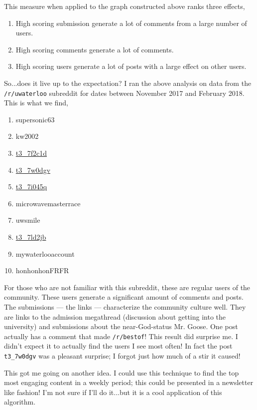 This measure when applied to the graph constructed above ranks three effects,
\begin{enumerate}
  \item{
    High scoring submission generate a lot of comments from a large number of users.
  }
  \item{
    High scoring comments generate a lot of comments.
  }
  \item{
    High scoring users generate a lot of posts with a large effect on other users.
  }
\end{enumerate}
So...does it live up to the expectation?
I ran the above analysis on data from the \texttt{/r/uwaterloo} subreddit for dates between November 2017 and February 2018.
This is what we find,
\begin{enumerate}
  \item{supersonic63}
  \item{kw2002}
  \item{\href{https://www.reddit.com/r/uwaterloo/comments/7f2c1d/}{t3\_7f2c1d}}
  \item{\href{https://www.reddit.com/r/uwaterloo/comments/7w0dgv/}{t3\_7w0dgv}}
  \item{\href{https://www.reddit.com/r/uwaterloo/comments/7i045q/}{t3\_7i045q}}
  \item{microwavemasterrace}
  \item{uwsmile}
  \item{\href{https://www.reddit.com/r/uwaterloo/comments/7ld2jb/}{t3\_7ld2jb}}
  \item{mywaterlooaccount}
  \item{honhonhonFRFR}
\end{enumerate}
For those who are not familiar with this subreddit, these are regular users of the community.
These users generate a significant amount of comments and posts.
The submissions --- the links --- characterize the community culture well.
They are links to the admission megathread (discussion about getting into the university) and submissions about the near-God-status Mr. Goose.
One post actually has a comment that made \texttt{/r/bestof}!
This result did surprise me.
I didn't expect it to actually find the users I see most often!
In fact the post \texttt{t3\_7w0dgv} was a pleasant surprise;
I forgot just how much of a stir it caused!

This got me going on another idea.
I could use this technique to find the top most engaging content in a weekly period; this could be presented in a newsletter like fashion!
I'm not sure if I'll do it...but it is a cool application of this algorithm.
